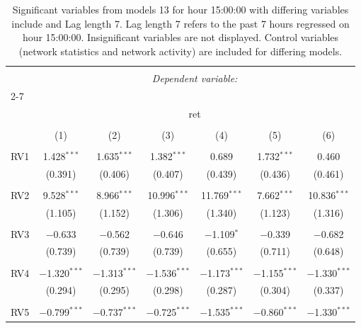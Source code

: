 
\begin{table}[!htbp] \centering 
  \caption{Significant variables from models 13 for hour 15:00:00 with differing variables include 
                               and Lag length 7. Lag length 7 refers to the past 7 hours regressed on hour 15:00:00. 
                               Insignificant variables are not displayed. 
                               Control variables (network statistics and network activity) are 
                               included for differing models.} 
  \label{RVmodels1_t_hourlagged2} 
\scriptsize 
\begin{tabular}{@{\extracolsep{5pt}}lcccccc} 
\\[-1.8ex]\hline 
\hline \\[-1.8ex] 
 & \multicolumn{6}{c}{\textit{Dependent variable:}} \\ 
\cline{2-7} 
\\[-1.8ex] & \multicolumn{6}{c}{ret} \\ 
\\[-1.8ex] & (1) & (2) & (3) & (4) & (5) & (6)\\ 
\hline \\[-1.8ex] 
 RV1 & 1.428$^{***}$ & 1.635$^{***}$ & 1.382$^{***}$ & 0.689 & 1.732$^{***}$ & 0.460 \\ 
  & (0.391) & (0.406) & (0.407) & (0.439) & (0.436) & (0.461) \\ 
  & & & & & & \\ 
 RV2 & 9.528$^{***}$ & 8.966$^{***}$ & 10.996$^{***}$ & 11.769$^{***}$ & 7.662$^{***}$ & 10.836$^{***}$ \\ 
  & (1.105) & (1.152) & (1.306) & (1.340) & (1.123) & (1.316) \\ 
  & & & & & & \\ 
 RV3 & $-$0.633 & $-$0.562 & $-$0.646 & $-$1.109$^{*}$ & $-$0.339 & $-$0.682 \\ 
  & (0.739) & (0.739) & (0.739) & (0.655) & (0.711) & (0.648) \\ 
  & & & & & & \\ 
 RV4 & $-$1.320$^{***}$ & $-$1.313$^{***}$ & $-$1.536$^{***}$ & $-$1.173$^{***}$ & $-$1.155$^{***}$ & $-$1.330$^{***}$ \\ 
  & (0.294) & (0.295) & (0.298) & (0.287) & (0.304) & (0.337) \\ 
  & & & & & & \\ 
 RV5 & $-$0.799$^{***}$ & $-$0.737$^{***}$ & $-$0.725$^{***}$ & $-$1.535$^{***}$ & $-$0.860$^{***}$ & $-$1.330$^{***}$ \\ 

\end{tabular}
\end{table}

